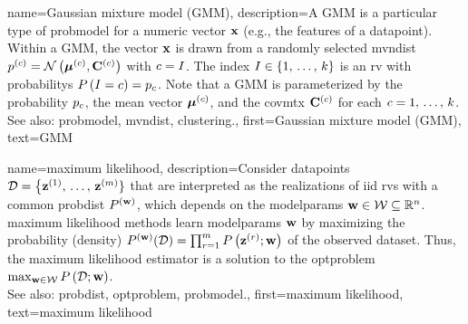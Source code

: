 {name={Gaussian mixture model (GMM)}, 
	description={A GMM 
		is a particular type of \gls{probmodel} for a numeric \gls{vector} ${\bf x}$ (e.g., 
		the \glspl{feature} of a \gls{datapoint}). Within a GMM, the \gls{vector} ${\bf x}$ 
		is drawn from a randomly selected \gls{mvndist} 
		$p^{(c)} = \mathcal{N}\left({\bm \mu}^{(c)},\mathbf{C}^{(c)}\right)$ with 
		$c = I$. The index $I \in \{1, \,\ldots, \,k\}$ is an \gls{rv} with 
		\glspl{probability} $P\left(I=c\right) = p_{c}$.
	     	Note that a GMM is parameterized by the \gls{probability} $p_{c}$, the 
		\gls{mean} \gls{vector} ${\bm \mu}^{(c)}$, and the \gls{covmtx} $\mathbf{C}^{(c)}$ 
		for each $c=1, \,\ldots, \,k$. 
				\\
		See also: \gls{probmodel}, \gls{mvndist}, \gls{clustering}.},
	first={Gaussian mixture model (GMM)},
	text={GMM} 
}
 
{name={maximum likelihood}, 
	description={Consider \glspl{datapoint} 
	$\mathcal{D}=\big\{ {\bf z}^{(1)}, \,\ldots, \,{\bf z}^{(m)} \}$ 
	that are interpreted as the \glspl{realization} of \gls{iid} \glspl{rv} 
	with a common \gls{probdist} $P^{({\bf w})}$, which depends 
	on the \gls{modelparams} ${\bf w} \in \mathcal{W} \subseteq \mathbb{R}^{n}$. 
		\Gls{maximum} likelihood methods learn \gls{modelparams} ${\bf w}$ by maximizing 
		the probability (density) $P^{({\bf w})}(\mathcal{D}) = \prod_{r=1}^{m} P\left({\bf z}^{(r)}; {\bf w}\right)$ 
		of the observed \gls{dataset}. Thus, the \gls{maximum} likelihood estimator is a 
		solution to the \gls{optproblem} $\max_{{\bf w} \in \mathcal{W}} P\left(\mathcal{D}; {\bf w}\right)$.
				\\
		See also: \gls{probdist}, \gls{optproblem}, \gls{probmodel}.},
	first={maximum likelihood},
	text={maximum likelihood}
}


